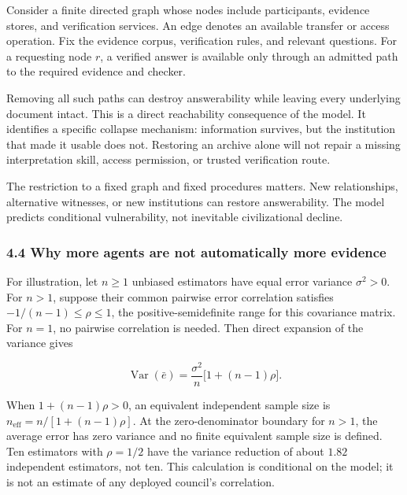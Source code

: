 \documentclass[
  10pt,
]{article}
\begin{document}
Consider a finite directed graph whose nodes include participants, evidence stores, and verification services. An edge denotes an available transfer or access operation. Fix the evidence corpus, verification rules, and relevant questions. For a requesting node \protect\hypertarget{math-E0054-0065}{}{\(r\)}, a verified answer is available only through an admitted path to the required evidence and checker.

Removing all such paths can destroy answerability while leaving every underlying document intact. This is a direct reachability consequence of the model. It identifies a specific collapse mechanism: information survives, but the institution that made it usable does not. Restoring an archive alone will not repair a missing interpretation skill, access permission, or trusted verification route.

The restriction to a fixed graph and fixed procedures matters. New relationships, alternative witnesses, or new institutions can restore answerability. The model predicts conditional vulnerability, not inevitable civilizational decline.

\subsubsection{4.4 Why more agents are not automatically more evidence}\label{why-more-agents-are-not-automatically-more-evidence}

For illustration, let \protect\hypertarget{math-E0055-0066}{}{\(n\geq 1\)} unbiased estimators have equal error variance \protect\hypertarget{math-E0056-0067}{}{\(\sigma^2>0\)}. For \protect\hypertarget{math-E0057-0068}{}{\(n>1\)}, suppose their common pairwise error correlation satisfies \protect\hypertarget{math-E0058-0069}{}{\(-1/(n-1)\leq\rho\leq1\)}, the positive-semidefinite range for this covariance matrix. For \protect\hypertarget{math-E0059-0070}{}{\(n=1\)}, no pairwise correlation is needed. Then direct expansion of the variance gives

\protect\hypertarget{math-E0060-0071}{}{\[
\operatorname{Var}(\bar e)=\frac{\sigma^2}{n}\bigl[1+(n-1)\rho\bigr].
\]}

When \protect\hypertarget{math-E0061-0072}{}{\(1+(n-1)\rho>0\)}, an equivalent independent sample size is \protect\hypertarget{math-E0062-0073}{}{\(n_{\mathrm{eff}}=n/[1+(n-1)\rho]\)}. At the zero-denominator boundary for \protect\hypertarget{math-E0057-0074}{}{\(n>1\)}, the average error has zero variance and no finite equivalent sample size is defined. Ten estimators with \protect\hypertarget{math-E0063-0075}{}{\(\rho=1/2\)} have the variance reduction of about \protect\hypertarget{math-E0064-0076}{}{\(1.82\)} independent estimators, not ten. This calculation is conditional on the model; it is not an estimate of any deployed council's correlation.
\end{document}
